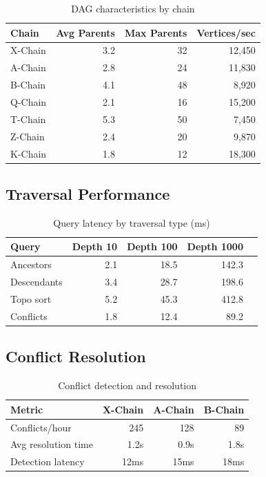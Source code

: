 \documentclass[11pt,twocolumn]{article}
\begin{document}
\begin{table}[h]
\centering
\caption{DAG characteristics by chain}
\begin{tabular}{@{}lrrr@{}}
\toprule
Chain & Avg Parents & Max Parents & Vertices/sec \\
\midrule
X-Chain & 3.2 & 32 & 12,450 \\
A-Chain & 2.8 & 24 & 11,830 \\
B-Chain & 4.1 & 48 & 8,920 \\
Q-Chain & 2.1 & 16 & 15,200 \\
T-Chain & 5.3 & 50 & 7,450 \\
Z-Chain & 2.4 & 20 & 9,870 \\
K-Chain & 1.8 & 12 & 18,300 \\
\bottomrule
\end{tabular}
\label{tab:dag-stats}
\end{table}

\subsection{Traversal Performance}

\begin{table}[h]
\centering
\caption{Query latency by traversal type (ms)}
\begin{tabular}{@{}lrrrr@{}}
\toprule
Query & Depth 10 & Depth 100 & Depth 1000 \\
\midrule
Ancestors & 2.1 & 18.5 & 142.3 \\
Descendants & 3.4 & 28.7 & 198.6 \\
Topo sort & 5.2 & 45.3 & 412.8 \\
Conflicts & 1.8 & 12.4 & 89.2 \\
\bottomrule
\end{tabular}
\label{tab:traversal-latency}
\end{table}

\subsection{Conflict Resolution}

\begin{table}[h]
\centering
\caption{Conflict detection and resolution}
\begin{tabular}{@{}lrrr@{}}
\toprule
Metric & X-Chain & A-Chain & B-Chain \\
\midrule
Conflicts/hour & 245 & 128 & 89 \\
Avg resolution time & 1.2s & 0.9s & 1.8s \\
Detection latency & 12ms & 15ms & 18ms \\
\bottomrule
\end{tabular}
\label{tab:conflict-stats}
\end{table}
\end{document}
